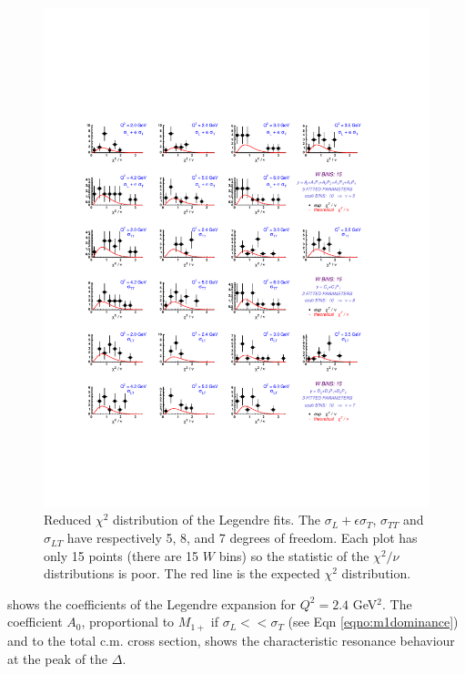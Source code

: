 \begin{figure}[h]
 \includegraphics[width = 15.4cm, bb=40 100 530 640]{analysis/img/chi2_rtm} 
  \caption[Reduced $\chi^2$ distribution of the Legendre fits]
          { Reduced $\chi^2$ distribution of the Legendre fits. 
	             The $\sigma_L + \epsilon\sigma_T$, $\sigma_{TT}$ and  $\sigma_{LT}$ have respectively
		     5, 8, and 7 degrees of freedom. Each plot has only 15 points (there are 15 $W$ bins)
		     so the statistic of the $\chi^2/\nu $ distributions is poor. The red line is the expected 
		     $\chi^2$ distribution.}
 \label{fig:chi2_rtm}
\end{figure}

\cia
{} shows the coefficients of the Legendre expansion for $Q^2=2.4$ GeV$^2$.
The coefficient $A_0 $, proportional to $M_{1+}$ if $\sigma_L << \sigma_T$ (see Eqn \ref{eqno:m1dominance}) and to the total c.m. cross section, 
shows the characteristic
resonance behaviour at the peak of the $\Delta$.



